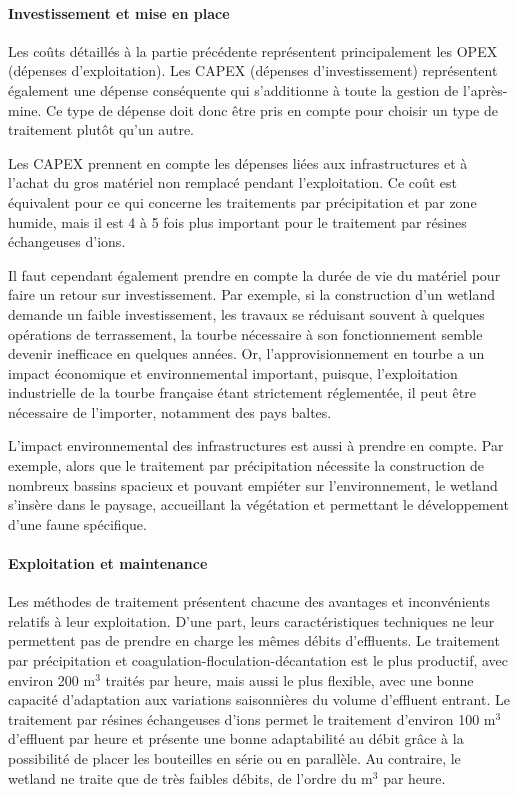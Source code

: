 \documentclass{article}
\begin{document}
\paragraph{Investissement et mise en place}

Les coûts détaillés à la partie précédente représentent principalement les OPEX (dépenses d’exploitation). Les CAPEX (dépenses d’investissement) représentent également une dépense conséquente qui s'additionne à toute la gestion de l’après-mine. Ce type de dépense doit donc être pris en compte pour choisir un type de traitement plutôt qu’un autre.

Les CAPEX prennent en compte les dépenses liées aux infrastructures et à l’achat du gros matériel non remplacé pendant l’exploitation. Ce coût est équivalent pour ce qui concerne les traitements par précipitation et par zone humide, mais il est 4 à 5 fois plus important pour le traitement par résines échangeuses d’ions.

Il faut cependant également prendre en compte la durée de vie du matériel pour faire un retour sur investissement. Par exemple, si la construction d’un wetland demande un faible investissement, les travaux se réduisant souvent à quelques opérations de terrassement, la tourbe nécessaire à son fonctionnement semble devenir inefficace en quelques années. Or, l’approvisionnement en tourbe a un impact économique et environnemental important, puisque, l’exploitation industrielle de la tourbe française étant strictement réglementée, il peut être nécessaire de l’importer, notamment des pays baltes. 

L’impact environnemental des infrastructures est aussi à prendre en compte. Par exemple, alors que le traitement par précipitation nécessite la construction de nombreux bassins spacieux et pouvant empiéter sur l’environnement, le wetland s’insère dans le paysage, accueillant la végétation et permettant le développement d’une faune spécifique.

\paragraph{Exploitation et maintenance}

Les méthodes de traitement présentent chacune des avantages et inconvénients relatifs à leur exploitation. D’une part, leurs caractéristiques techniques ne leur permettent pas de prendre en charge les mêmes débits d’effluents. Le traitement par précipitation et coagulation-floculation-décantation est le plus productif, avec environ 200 $\text{m}^3$ traités par heure, mais aussi le plus flexible, avec une bonne capacité d’adaptation aux variations saisonnières du volume d’effluent entrant. 
Le traitement par résines échangeuses d’ions permet le traitement d’environ 100 $\text{m}^3$ d’effluent par heure et présente une bonne adaptabilité au débit grâce à la possibilité de placer les bouteilles en série ou en parallèle. Au contraire, le wetland ne traite que de très faibles débits, de l’ordre du $\text{m}^3$ par heure.
\end{document}

